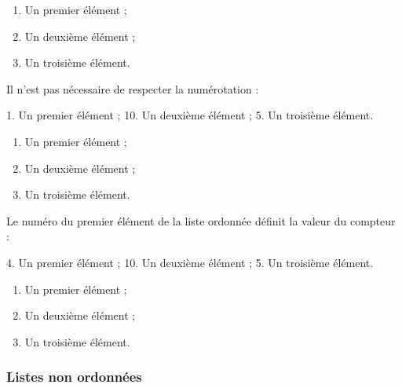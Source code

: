 \documentclass[
  11pt,
]{book}
\newenvironment{Shaded}{\begin{snugshade}}{\end{snugshade}}
\newcommand{\NormalTok}[1]{#1}
\newcommand{\SpecialStringTok}[1]{\textcolor[rgb]{0.31,0.60,0.02}{#1}}
\providecommand{\tightlist}{%
  \setlength{\itemsep}{0pt}\setlength{\parskip}{0pt}}
\numberwithin{equation}{section}
\numberwithin{countremarque}{section}
\begin{document}
\begin{enumerate}
\def\labelenumi{\arabic{enumi}.}
\tightlist
\item
  Un premier élément ;
\item
  Un deuxième élément ;
\item
  Un troisième élément.
\end{enumerate}

Il n'est pas nécessaire de respecter la numérotation :

\begin{Shaded}
\begin{Highlighting}[]
\SpecialStringTok{1. }\NormalTok{Un premier élément ;}
\SpecialStringTok{10. }\NormalTok{Un deuxième élément ;}
\SpecialStringTok{5. }\NormalTok{Un troisième élément.}
\end{Highlighting}
\end{Shaded}

\begin{enumerate}
\def\labelenumi{\arabic{enumi}.}
\tightlist
\item
  Un premier élément ;
\item
  Un deuxième élément ;
\item
  Un troisième élément.
\end{enumerate}

Le numéro du premier élément de la liste ordonnée définit la valeur du compteur :

\begin{Shaded}
\begin{Highlighting}[]
\SpecialStringTok{4. }\NormalTok{Un premier élément ;}
\SpecialStringTok{10. }\NormalTok{Un deuxième élément ;}
\SpecialStringTok{5. }\NormalTok{Un troisième élément.}
\end{Highlighting}
\end{Shaded}

\begin{enumerate}
\def\labelenumi{\arabic{enumi}.}
\setcounter{enumi}{3}
\tightlist
\item
  Un premier élément ;
\item
  Un deuxième élément ;
\item
  Un troisième élément.
\end{enumerate}

\hypertarget{listes-non-ordonnuxe9es}{%
\subsubsection{Listes non ordonnées}\label{listes-non-ordonnuxe9es}}
\end{document}
